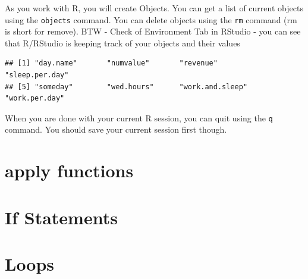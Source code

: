 \documentclass[10pt, letterpaper, twoside]{memoir}\usepackage{knitr}
\begin{document}
As you work with R, you will create Objects. You can get a list of current objects using the \texttt{objects} command. You can delete objects using the \texttt{rm} command (rm is short for remove). BTW - Check of Environment Tab in RStudio - you can see that R/RStudio is keeping track of your objects and their values

\begin{knitrout}
\color{fgcolor}\begin{kframe}
\begin{alltt}
\hlstd{()}
\end{alltt}
\begin{verbatim}
## [1] "day.name"       "numvalue"       "revenue"        "sleep.per.day" 
## [5] "someday"        "wed.hours"      "work.and.sleep" "work.per.day"
\end{verbatim}
\begin{alltt}
\hlstd{(} \hlstd{=} \hlstd{())}  
\end{alltt}
\end{kframe}
\end{knitrout}


When you are done with your current R session, you can quit using the \texttt{q} command. You should save your current session first though.
\begin{knitrout}
\color{fgcolor}\begin{kframe}
\begin{alltt}
\hlstd{(} \hlstd{=} \hlstd{)}
\hlstd{()}
\end{alltt}
\end{kframe}
\end{knitrout}


\section{apply functions}

\section{If Statements}

\section{Loops}
\end{document}
